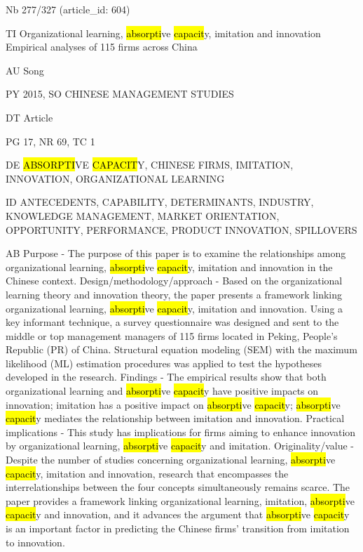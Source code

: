 \documentclass[a4paper]{article}
\begin{document}
\vspace*{-2cm}
Nb \tabto{0cm}277/327 (article\_id: 604)\par
TI \tabto{0cm}Organizational learning, \hl{absorpti}ve \hl{capacit}y, imitation and innovation Empirical analyses of 115 firms across China\par
AU \tabto{0cm}Song\par
PY \tabto{0cm}2015, SO CHINESE MANAGEMENT STUDIES\par
DT \tabto{0cm}Article\par
PG \tabto{0cm}17, NR 69, TC 1\par
DE \tabto{0cm}\hl{ABSORPTI}VE \hl{CAPACIT}Y, CHINESE FIRMS, IMITATION, INNOVATION, ORGANIZATIONAL LEARNING\par
ID \tabto{0cm}ANTECEDENTS, CAPABILITY, DETERMINANTS, INDUSTRY, KNOWLEDGE MANAGEMENT, MARKET ORIENTATION, OPPORTUNITY, PERFORMANCE, PRODUCT INNOVATION, SPILLOVERS\par
AB \tabto{0cm}Purpose - The purpose of this paper is to examine the relationships among organizational learning, \hl{absorpti}ve \hl{capacit}y, imitation and innovation in the Chinese context.
Design/methodology/approach - Based on the organizational learning theory and innovation theory, the paper presents a framework linking organizational learning, \hl{absorpti}ve \hl{capacit}y, imitation and innovation. Using a key informant technique, a survey questionnaire was designed and sent to the middle or top management managers of 115 firms located in Peking, People's Republic (PR) of China. Structural equation modeling (SEM) with the maximum likelihood (ML) estimation procedures was applied to test the hypotheses developed in the research.
Findings - The empirical results show that both organizational learning and \hl{absorpti}ve \hl{capacit}y have positive impacts on innovation; imitation has a positive impact on \hl{absorpti}ve \hl{capacit}y; \hl{absorpti}ve \hl{capacit}y mediates the relationship between imitation and innovation.
Practical implications - This study has implications for firms aiming to enhance innovation by organizational learning, \hl{absorpti}ve \hl{capacit}y and imitation.
Originality/value - Despite the number of studies concerning organizational learning, \hl{absorpti}ve \hl{capacit}y, imitation and innovation, research that encompasses the interrelationships between the four concepts simultaneously remains scarce. The paper provides a framework linking organizational learning, imitation, \hl{absorpti}ve \hl{capacit}y and innovation, and it advances the argument that \hl{absorpti}ve \hl{capacit}y is an important factor in predicting the Chinese firms' transition from imitation to innovation.\par
\clearpage
\end{document}

